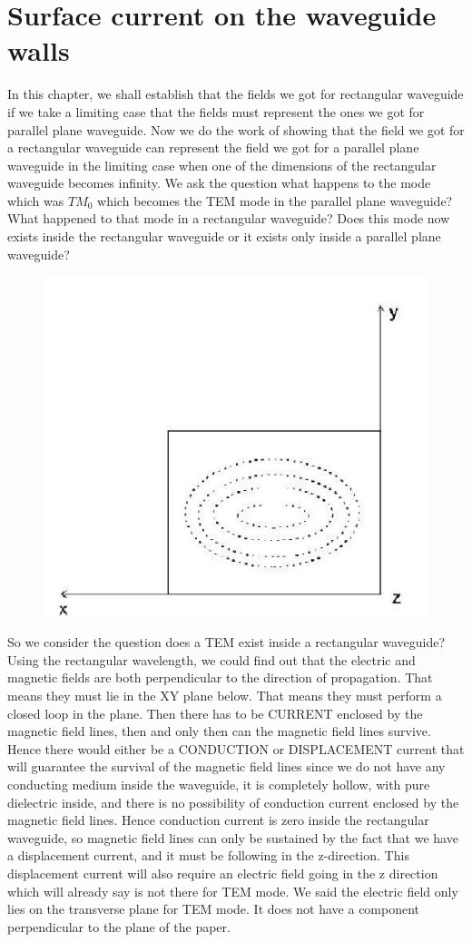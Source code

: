 \chapter{Surface current on the waveguide walls}
In this chapter, we shall establish that the fields we got for rectangular waveguide if we take a limiting case that the fields must represent the ones we got for parallel plane waveguide. Now we do the work of showing that the field we got for a rectangular waveguide can represent the field we got for a parallel plane waveguide in the limiting case when one of the dimensions of the rectangular waveguide becomes infinity. We ask the question what happens to the mode which was $TM_0$ which becomes the TEM mode in the parallel plane waveguide? What happened to that mode in a rectangular waveguide? Does this mode now exists inside the rectangular waveguide or it exists only inside a parallel plane waveguide?
\begin{figure}[h]
\centering
\includegraphics[width=0.6\linewidth]{./graphics/group4001}
\caption{}
\end{figure}
 So we consider the question does a TEM exist inside a rectangular waveguide? Using the rectangular wavelength, we could find out that the electric and magnetic fields are both perpendicular to the direction of propagation. That means they must lie in the XY plane below. That means they must perform a closed loop in the plane. Then there has to be CURRENT enclosed by the magnetic field lines, then and only then can the magnetic field lines survive. Hence there would either be a CONDUCTION or DISPLACEMENT current that will guarantee the survival of the magnetic field lines since we do not have any conducting medium inside the waveguide, it is completely hollow, with pure dielectric inside, and there is no possibility of conduction current enclosed by the magnetic field lines. Hence conduction current is zero inside the rectangular waveguide, so magnetic field lines can only be sustained by the fact that we have a displacement current, and it must be following in the z-direction. This displacement current will also require an electric field going in the z direction which will already say is not there for TEM mode. We said the electric field only lies on the transverse plane for TEM mode. It does not have a component perpendicular to the plane of the paper.

